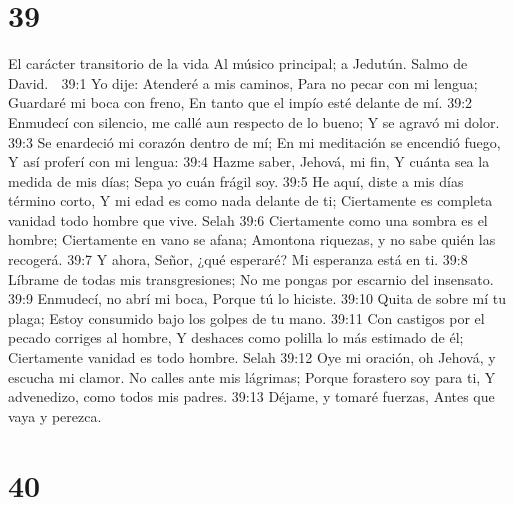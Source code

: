 \chapter{39}

El carácter transitorio de la vida 
Al músico principal; a Jedutún. Salmo de David. 

39:1 Yo dije: Atenderé a mis caminos, 
Para no pecar con mi lengua; 
Guardaré mi boca con freno, 
En tanto que el impío esté delante de mí. 
39:2 Enmudecí con silencio, me callé aun respecto de lo bueno; 
Y se agravó mi dolor. 
39:3 Se enardeció mi corazón dentro de mí; 
En mi meditación se encendió fuego, 
Y así proferí con mi lengua: 
39:4 Hazme saber, Jehová, mi fin, 
Y cuánta sea la medida de mis días; 
Sepa yo cuán frágil soy. 
39:5 He aquí, diste a mis días término corto, 
Y mi edad es como nada delante de ti; 
Ciertamente es completa vanidad todo hombre que vive. Selah 
39:6 Ciertamente como una sombra es el hombre; 
Ciertamente en vano se afana; 
Amontona riquezas, y no sabe quién las recogerá. 
39:7 Y ahora, Señor, ¿qué esperaré? 
Mi esperanza está en ti. 
39:8 Líbrame de todas mis transgresiones; 
No me pongas por escarnio del insensato. 
39:9 Enmudecí, no abrí mi boca, 
Porque tú lo hiciste. 
39:10 Quita de sobre mí tu plaga; 
Estoy consumido bajo los golpes de tu mano. 
39:11 Con castigos por el pecado corriges al hombre, 
Y deshaces como polilla lo más estimado de él; 
Ciertamente vanidad es todo hombre. Selah 
39:12 Oye mi oración, oh Jehová, y escucha mi clamor. 
No calles ante mis lágrimas; 
Porque forastero soy para ti, 
Y advenedizo, como todos mis padres. 
39:13 Déjame, y tomaré fuerzas, 
Antes que vaya y perezca. 

\chapter{40}

